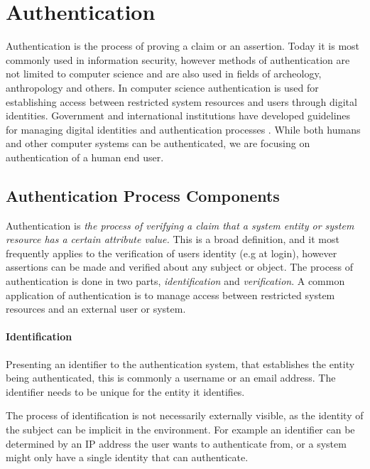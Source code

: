 \section{Authentication}

Authentication is the process of proving a claim or an assertion.
Today it is most commonly used in information security, however methods of authentication are not limited to computer science and are also used in fields of archeology, anthropology and others.
\bigskip
\newline
In computer science authentication is used for establishing access between restricted system resources and users through digital identities.
Government and international institutions have developed guidelines for managing digital identities and authentication processes \cite{grassi2017} .
\bigskip
\newline
While both humans and other computer systems can be authenticated, we are focusing on authentication of a human end user.

\subsection{Authentication Process Components}

Authentication \cite{shirey2007internet} is \textit{the process of verifying a claim that a system entity or system resource has a certain attribute value.}
This is a broad definition, and it most frequently applies to the verification of users identity (e.g at login), however assertions can be made and verified about any subject or object.
The process of authentication is done in two parts, \textit{identification} and \textit{verification}.
A common application of authentication is to manage access between restricted system resources and an external user or system.

\paragraph{Identification} Presenting an identifier to the authentication system, that establishes the entity being authenticated, this is commonly a username or an email address.
The identifier needs to be unique for the entity it identifies.

The process of identification is not necessarily externally visible, as the identity of the subject can be implicit in the environment. 
For example an identifier can be determined by an IP address the user wants to authenticate from, or a system might only have a single identity that can authenticate.

